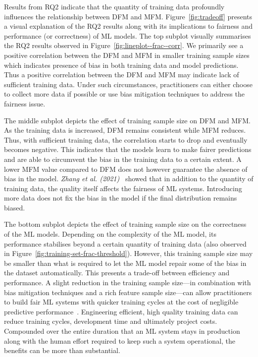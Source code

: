 \documentclass[conference]{IEEEtran}
\begin{document}
Results from RQ2 indicate that the quantity of training data
profoundly influences the relationship between DFM and MFM.
Figure \ref{fig:tradeoff} presents a visual explanation of the RQ2
results along with its implications to fairness and performance (or
correctness) of ML models. The top subplot visually summarises the RQ2
results observed in Figure \ref{fig:lineplot--frac--corr}. We
primarily see a positive correlation between the DFM and MFM in
smaller training sample sizes which indicates presence of bias in both
training data and model predictions. Thus a positive correlation
between the DFM and MFM may indicate lack of sufficient training data.
Under such circumstances, practitioners can either choose to collect
more data if possible or use bias mitigation techniques to address the
fairness issue.

The middle subplot depicts the effect of training sample size on DFM and MFM. As the training data is increased, DFM remains consistent while MFM reduces. Thus, with sufficient training data, the correlation starts to drop and eventually becomes negative. This indicates that the models learn to make fairer predictions and are able to circumvent the bias in the training data to a certain extent. A lower MFM value compared to DFM does not however guarantee the absence of bias in the model. \emph{Zhang et al. (2021)}~\cite{zhang2021ignorance} showed that in addition to the quantity of training data, the quality itself affects the fairness of ML systems. Introducing more data does not fix the bias in the model if the final distribution remains biased.

The bottom subplot depicts the effect of training sample size on the
correctness of the ML models. Depending on the complexity of the ML
model, its performance stabilises beyond a certain quantity of
training data (also observed in
Figure \ref{fig:training-set-frac-threshold}). However, this training
sample size may be smaller than what is required to let the ML model
repair some of the bias in the dataset automatically. This presents a
trade-off between efficiency and performance. A slight reduction in
the training sample size---in combination with bias mitigation
techniques and a rich feature sample size---can allow practitioners to
build fair ML systems with quicker training cycles at the cost of
negligible predictive
performance \cite{verdecchia2022data,zhang2021ignorance}. Engineering
efficient, high quality training data can reduce training cycles,
development time and ultimately project costs. Compounded over the
entire duration that an ML system stays in production along with the
human effort required to keep such a system operational, the benefits
can be more than substantial.
\end{document}

